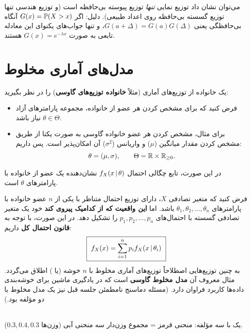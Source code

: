 \begin{note}
\notetitle می‌توان نشان داد توزیع نمایی \emph{تنها} توزیع پیوسته بی‌حافظه است (و توزیع هندسی تنها توزیع گسسته بی‌حافظه روی اعداد طبیعی). دلیل: اگر $G(x)=\mathbb{P}(X>x)$ آنگاه بی‌حافظگی یعنی $G(a+\Delta)=G(a)G(\Delta)$، و تنها جواب‌های یکنوای این معادله تابعی به صورت $G(x)=e^{-\lambda x}$ هستند.
\end{note}

\section{مدل‌های آماری مخلوط }

یک خانواده از توزیع‌های آماری (مثلاً \textbf{خانواده توزیع‌های گاوسی}) را در نظر بگیرید:
\begin{itemize}
\item فرض کنید که برای مشخص کردن هر عضو از خانواده، مجموعه پارامترهای آزاد $\theta\in\Theta$ نیاز باشد.
\item برای مثال، مشخص کردن هر عضو خانواده گاوسی به صورت یکتا از طریق مشخص کردن مقدار میانگین ($\mu$) و واریانس ($\sigma^2$) آن امکان‌پذیر است. پس داریم:
\[
\theta=(\mu,\sigma),\qquad\Theta=\mathbb{R}\times\mathbb{R}_{\ge0}.
\]
\end{itemize}
در این صورت، تابع چگالی احتمال $f_X(x\,|\,\theta)$ نشان‌دهنده یک عضو از خانواده با پارامترهای $\theta$ است.

فرض کنید که متغیر تصادفی $X$، دارای توزیع احتمال متناظر با یکی از $n$ عضو خانواده با پارامترهای $\theta_1,\theta_2,\ldots,\theta_n$ باشد. اما \textbf{این واقعیت که از کدامیک پیروی کند} خود یک متغیر تصادفی گسسته با احتمال‌های $p_1,p_2,\ldots,p_n$ را تشکیل دهد. در این صورت، با توجه به \textbf{قانون احتمال کل} داریم:
\[
\boxed{\ f_X(x)=\sum_{i=1}^{n}p_if_X(x\given\theta_i)\ }
\]
به چنین توزیع‌هایی اصطلاحاً توزیع‌های آماری مخلوط با $n$ خوشه (یا ) اطلاق می‌گردد. مثال معروف آن \textbf{مدل مخلوط گاوسی}  است که در یادگیری ماشین برای خوشه‌بندی داده‌ها کاربرد فراوان دارد. (مسئله دماسنج نامطمئن جلسه قبل نیز یک مدل مخلوط با دو مؤلفه بود.)

\begin{center}
\\
{\small یک  با سه مؤلفه: منحنی قرمز = مجموع وزن‌دار سه منحنی آبی (وزن‌ها $0.3,0.4,0.3$).}
\end{center}


